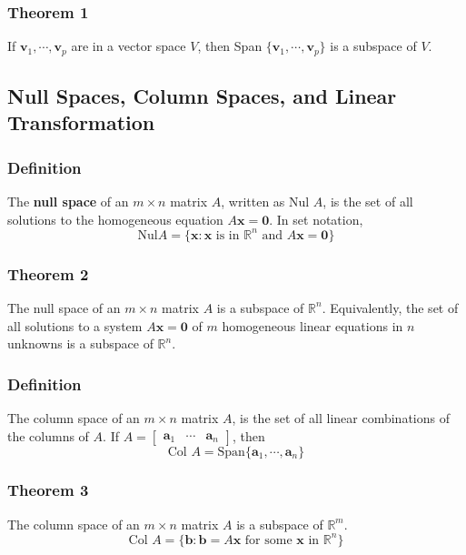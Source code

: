 \documentclass[letterpaper,11pt]{article}
\begin{document}
			\subsubsection{Theorem 1}
				If $\mathbf{v}_1,\cdots,\mathbf{v}_p$ are in a vector space $V$, then Span $\{\mathbf{v}_1,\cdots,\mathbf{v}_p\}$ is a subspace of $V$.
		\subsection{Null Spaces, Column Spaces, and Linear Transformation}
			\subsubsection{Definition}
				The \textbf{null space} of an $m\times n$ matrix $A$, written as Nul $A$, is the set of all solutions to the homogeneous equation $A\mathbf{x}=\mathbf{0}$. In set notation,
				\begin{equation}
					\textrm{Nul}A=\{\mathbf{x}:\mathbf{x}\textrm{ is in }\mathbb{R}^n\textrm{ and }A\mathbf{x}=\mathbf{0}\}
				\end{equation}
			\subsubsection{Theorem 2}
				The null space of an $m\times n$ matrix $A$ is a subspace of $\mathbb{R}^n$. Equivalently, the set of all solutions to a system $A\mathbf{x}=\mathbf{0}$ of $m$ homogeneous linear equations in $n$ unknowns is a subspace of $\mathbb{R}^n$.
			\subsubsection{Definition}
				The column space of an $m\times n$ matrix $A$, is the set of all linear combinations of the columns of $A$. If $A=\begin{bmatrix}
					\mathbf{a}_1 & \cdots & \mathbf{a}_n
				\end{bmatrix}$, then
				\begin{equation}
					\textrm{Col }A=\textrm{Span}\{\mathbf{a}_1,\cdots,\mathbf{a}_n\}
				\end{equation}
			\subsubsection{Theorem 3}
				The column space of an $m\times n$ matrix $A$ is a subspace of $\mathbb{R}^m$.
				\begin{equation}
					\textrm{Col }A=\{\mathbf{b}:\mathbf{b}=A\mathbf{x}\textrm{ for some }\mathbf{x}\textrm{ in }\mathbb{R}^n\}
				\end{equation}
				
\end{document}
